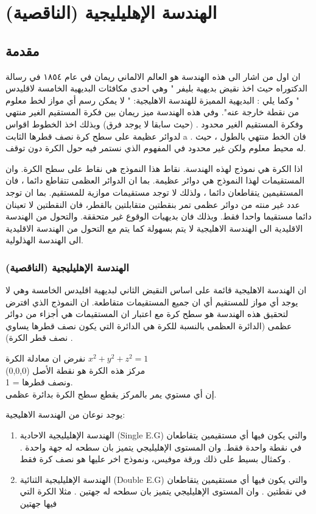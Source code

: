 \chapter{الهندسة الإهليليجية (الناقصية)}

\section[مقدمة]{مقدمة \cite{ref6}}
ان اول من اشار الى هذه الهندسة هو العالم الالماني ريمان في عام ١٨٥٤ في رسالة الدكتوراه حيث اخذ نقيض بديهية بليفر " وهي احدى مكافئات البديهية الخامسة لاقليدس " وكما يلي :
البديهية المميزة للهندسة الاهليجية:
" لا يمكن رسم أي مواز لخط معلوم من نقطة خارجة عنه".
وفي هذه الهندسة ميز ريمان بين فكرة المستقيم الغير منتهي وفكرة المستقيم الغير محدود .
(حيث سابقا لا يوجد فرق) وبذلك اخذ الخطوط اقواس لدوائر عظيمة على سطح كرة نصف قطرها الثابت a . فان الخط منتهي بالطول ، حيث له محيط معلوم ولكن غير محدود في المفهوم الذي نستمر فيه حول الكرة دون توقف.

اذا الكرة هي نموذج لهذه الهندسة.
نقاط هذا النموذج هي نقاط على سطح الكرة.
وان المستقيمات لهذا النموذج هي دوائر عظيمة. بما ان الدوائر العظمى تتقاطع دائما ، فان المستقيمين يتقاطعان دائما ، ولذلك لا توجد مستقيمات موازية للمستقيم.
بما ان توجد عدد غير منته من دوائر عظمى تمر بنقطتين متقابلتين بالقطر، فان النقطتين لا تعينان دائما مستقيما واحدا فقط. وبذلك فان بديهيات الوقوع غير متحققة. والتحول من الهندسة الاقليدية الى الهندسة الاهليجية لا يتم بسهولة كما يتم مع التحول من الهندسة الاقليدية الى الهندسة الهذلولية.

\subsection*{الهندسة الإهليليجية (الناقصية)}
ان الهندسة الاهليجية قائمة على اساس النقيض الثاني لبديهية اقليدس الخامسة وهي لا يوجد أي مواز للمستقيم أي ان جميع المستقيمات متقاطعة. ان النموذج الذي افترض لتحقيق هذه الهندسة هو سطح كرة مع اعتبار ان المستقيمات هي أجزاء من دوائر عظمى (الدائرة العظمى بالنسبة للكرة هي الدائرة التي يكون نصف قطرها يساوي نصف قطر الكرة) .

نفرض ان معادلة الكرة $x^2 + y^2 + z^2 = 1$\\
مركز هذه الكرة هو نقطة الأصل (0,0,0)\\
ونصف قطرها = 1.\\
إن أي مستوي يمر بالمركز يقطع سطح الكرة بدائرة عظمى.

يوجد نوعان من الهندسة الاهليجية:
\begin{enumerate}
	\item  الهندسة الإهليليجية الاحادية (Single E.G) والتي يكون فيها أي مستقيمين يتقاطعان في نقطة واحدة فقط. وان المستوى الإهليليجي يتميز بان سطحه له جهة واحدة . وكمثال بسيط على ذلك ورقة موفيس، ونموذج اخر عليها هو نصف كرة فقط .
	
	\item  الهندسة الإهليليجية الثنائية (Double E.G) والتي يكون فيها أي مستقيمين يتقاطعان في نقطتين . وان المستوى الإهليليجي يتميز بان سطحه له جهتين . مثلا الكرة التي فيها جهتين
\end{enumerate}


